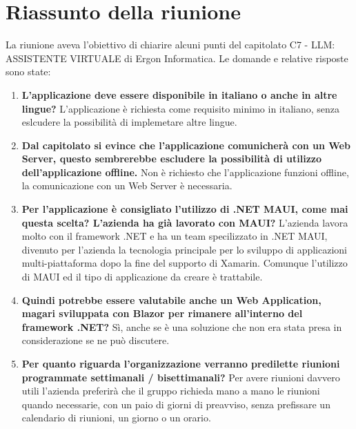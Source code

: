 \section{Riassunto della riunione}

    La riunione aveva l'obiettivo di chiarire alcuni punti del capitolato C7 - LLM: ASSISTENTE VIRTUALE di Ergon Informatica. Le domande e relative risposte sono state:
\begin{enumerate}
    \item \textbf{L'applicazione deve essere disponibile in italiano o anche in altre lingue?} L'applicazione è richiesta come requisito minimo in italiano, senza eslcudere la possibilità di implemetare altre lingue.
    \item \textbf{Dal capitolato si evince che l'applicazione comunicherà con un Web Server, questo sembrerebbe escludere la possibilità di utilizzo dell'applicazione offline.} Non è richiesto che l'applicazione funzioni offline, la comunicazione con un Web Server è necessaria.
     \item \textbf{Per l'applicazione è consigliato l'utilizzo di .NET MAUI, come mai questa scelta? L'azienda ha già lavorato con MAUI?} L'azienda lavora molto con il framework .NET e ha un team specilizzato in .NET MAUI, divenuto per l'azienda la tecnologia principale per lo sviluppo di applicazioni multi-piattaforma dopo la fine del supporto di Xamarin. Comunque l'utilizzo di MAUI ed il tipo di applicazione da creare è trattabile. 
    \item \textbf{Quindi potrebbe essere valutabile anche un Web Application, magari sviluppata con Blazor per rimanere all'interno del framework .NET?} Sì, anche se è una soluzione che non era stata presa in considerazione se ne può discutere.
    \item \textbf{Per quanto riguarda l'organizzazione verranno predilette riunioni programmate settimanali / bisettimanali?} Per avere riunioni davvero utili l'azienda preferirà che il gruppo richieda mano a mano le riunioni quando necessarie, con un paio di giorni di preavviso, senza prefissare un calendario di riunioni, un giorno o un orario.

\end{enumerate}


